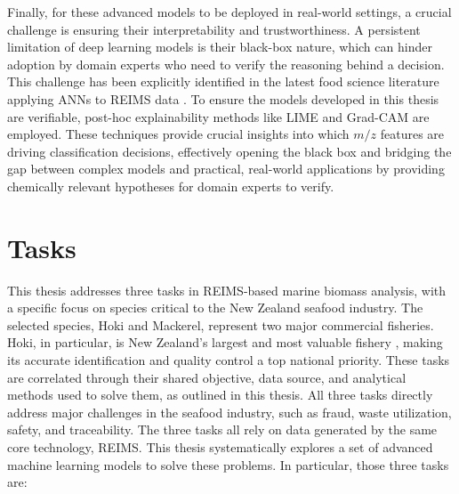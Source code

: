 Finally, for these advanced models to be deployed in real-world settings, a crucial challenge is ensuring their interpretability and trustworthiness. A persistent limitation of deep learning models is their black-box nature, which can hinder adoption by domain experts who need to verify the reasoning behind a decision. This challenge has been explicitly identified in the latest food science literature applying ANNs to REIMS data \citep{Cardoso2025}. To ensure the models developed in this thesis are verifiable, post-hoc explainability methods like LIME \citep{Ribeiro2016} and Grad-CAM \citep{Selvaraju2017} are employed. These techniques provide crucial insights into which $m/z$ features are driving classification decisions, effectively opening the black box and bridging the gap between complex models and practical, real-world applications by providing chemically relevant hypotheses for domain experts to verify.

\section{Tasks}

This thesis addresses three tasks in REIMS-based marine biomass analysis, with a specific focus on species critical to the New Zealand seafood industry. The selected species, Hoki and Mackerel, represent two major commercial fisheries. Hoki, in particular, is New Zealand's largest and most valuable fishery \citep{MPI2024}, making its accurate identification and quality control a top national priority. These tasks are correlated through their shared objective, data source, and analytical methods used to solve them, as outlined in this thesis. All three tasks directly address major challenges in the seafood industry, such as fraud, waste utilization, safety, and traceability. The three tasks all rely on data generated by the same core technology, REIMS. This thesis systematically explores a set of advanced machine learning models to solve these problems. In particular, those three tasks are:

